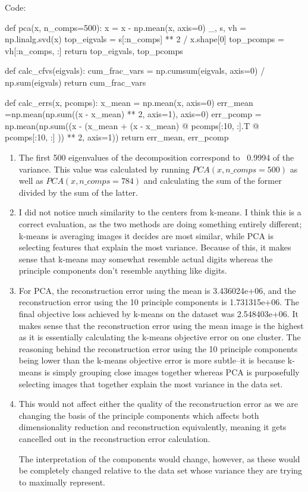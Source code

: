 \documentclass[submit]{harvardml}
\begin{document}
Code:

\begin{python}
def pca(x, n_comps=500):
    x = x - np.mean(x, axis=0)
    _, s, vh = np.linalg.svd(x)
    top_eigvals = s[:n_comps] ** 2 / x.shape[0]
    top_pcomps = vh[:n_comps, :]
    return top_eigvals, top_pcomps


def calc_cfvs(eigvals):
    cum_frac_vars = np.cumsum(eigvals, axis=0) / np.sum(eigvals)
    return cum_frac_vars    


def calc_errs(x, pcomps):
    x_mean = np.mean(x, axis=0)
    err_mean =np.mean(np.sum((x - x_mean) ** 2, axis=1), axis=0)
    err_pcomp = np.mean(np.sum((x - (x_mean + (x - x_mean) @ pcomps[:10, :].T @ pcomps[:10, :] )) ** 2, axis=1))
    return err_mean, err_pcomp
\end{python}

\begin{enumerate}
  \item 
  The first 500 eigenvalues of the decomposition correspond to ~0.9994 of the variance. 
  This value was calculated by running $PCA(x, n\_comps=500)$ as well as $PCA(x, n\_comps=784)$
  and calculating the sum of the former divided by the sum of the latter.
  
  \item
  I did not notice much similarity to the centers from k-means. I think this is a correct
  evaluation, as the two methods are doing something entirely different; k-means is averaging 
  images it decides are most similar, while PCA is selecting features that explain the most 
  variance. Because of this, it makes sense that k-means may somewhat resemble actual digits 
  whereas the principle components don't resemble anything like digits.
  
  \item 
  For PCA, the reconstruction error using the mean is 3.436024e+06, and the reconstruction error 
  using the 10 principle components is 1.731315e+06. The final objective loss achieved by 
  k-means on the dataset was 2.548403e+06. It makes sense that the reconstruction error
  using the mean image is the highest as it is essentially calculating the k-means objective error
  on one cluster. The reasoning behind the reconstruction error using the 10 principle components 
  being lower than the k-means objective error is more subtle--it is because k-means is simply 
  grouping close images together whereas PCA is purposefully selecting images that together
  explain the most variance in the data set.

  \item 
  This would not affect either the quality of the reconstruction error as we are
  changing the basis of the principle components which affects both dimensionality reduction
  and reconstruction equivalently, meaning it gets cancelled out in the reconstruction error 
  calculation.

  The interpretation of the components would change, however, as these would be completely changed
  relative to the data set whose variance they are trying to maximally represent.


\end{enumerate}
\end{document}
